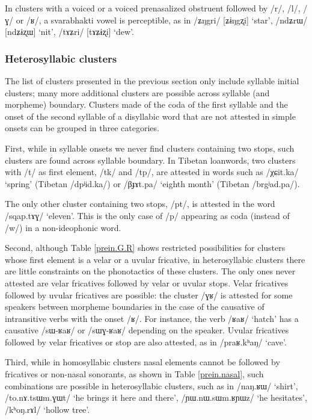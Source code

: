 \documentclass[oldfontcommands,oneside,a4paper,11pt]{article}
\newcommand{\ipa}[1]{/#1/} %
\begin{document}
In clusters with a voiced or a voiced prenasalized obstruent followed by \ipa{r}, \ipa{l}, \ipa{ɣ} or \ipa{ʁ}, a  svarabhakti vowel is perceptible, as in \ipa{ʑŋgri} [ʑɨŋgʐi] `star', \ipa{ndʑrɯ} [ndʑɨʐɯ] `nit', \ipa{tɤʑri} [tɤʑɨʐi] `dew'.
 
 
 
 \subsubsection{Heterosyllabic clusters} \label{sec:heterosyllabic.clusters}
 
 The list of clusters presented in the previous section only include syllable initial clusters; many more additional clusters are possible across syllable (and morpheme) boundary. Clusters made of the coda of the first syllable and the onset of the second syllable of a disyllabic word that are not attested in simple onsets can be grouped in three categories.
 
 First, while in syllable onsets we never find clusters containing two stops, such clusters are found across syllable boundary. In Tibetan loanwords, two clusters with \ipa{t} as first element,  \ipa{tk} and \ipa{tp}, are attested in words such as \ipa{χɕit.ka} `spring' (Tibetan \ipa{dpʲid.ka}) or \ipa{βɟɤt.pa} `eighth month' (Tibetan \ipa{brgʲad.pa}). 
 
 The only  other cluster containing two stops, \ipa{pt}, is attested in the word  \ipa{sqap.tɤɣ} `eleven'. This is the only case of \ipa{p} appearing as coda (instead of \ipa{w}) in a non-ideophonic  word.
 
 Second, although Table \ref{prein.G.R} shows restricted possibilities for clusters whose first element is a velar or a uvular fricative, in heterosyllabic clusters there are little constraints on the phonotactics of these clusters. The only ones never attested are velar fricatives followed by velar or uvular stops. Velar fricatives followed by uvular fricatives are possible:  the cluster \ipa{ɣʁ} is attested for some speakers between morpheme boundaries in the case of the causative of intransitive verbs with the onset \ipa{ʁ}. For instance, the verb \ipa{ʁaʁ} `hatch' has a causative \ipa{sɯ-ʁaʁ} or \ipa{sɯɣ-ʁaʁ} depending on the speaker. Uvular fricatives followed by velar fricatives or stop are also attested, as in \ipa{praʁ.kʰaŋ} `cave'.
 
Third, while in homosyllabic clusters nasal elements cannot be followed by fricatives or non-nasal sonorants, as shown in Table \ref{prein.nasal}, such combinations are possible in heterosyllabic clusters, such as in \ipa{naŋ.ʁɯ} `shirt', \ipa{to.nɤ.tsɯm.ɣɯt} `he brings it here and there', \ipa{ɲɯ.nɯ.sɯm.ʁɲɯz} `he hesitates', \ipa{kʰoŋ.rɤl} `hollow tree'.
\end{document}
